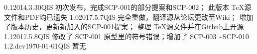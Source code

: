 


\begin{versionhistory}
	\vhEntry
	{0.1}{2014.3.30}{QIS}{
		初次发布，完成SCP-001的部分提案和SCP-002；
		此版本 \TeX 源文件和PDF均已遗失
	}
	\vhEntry
	{1.0}{2017.5.7}{QIS}{
		完全重做，翻译源从论坛更改至Wiki；
		增加了版本历史，更新新加入的SCP-001提案；
		整理 \TeX 源文件并在Github上\href{https://github.com/7sDream/scp-pdf}{开源}
	}
	\vhEntry
	{1.1}{2017.5.8}{QIS}{
		修改了 SCP-001 原型里的符号错误；增加了 SCP-003 \textasciitilde SCP-010
	}
	{1.2.dev}{\today}{QIS}{
		暂无
	}
\end{versionhistory}

